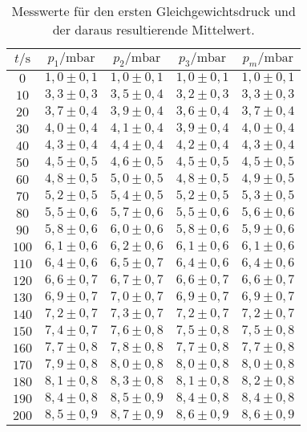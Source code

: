 \begin{table}[H]
  \centering
  \caption{Messwerte für den ersten Gleichgewichtsdruck und der daraus resultierende Mittelwert.}
  \label{tab:pm}
  \begin{tabular}{c c c c c}
    \toprule
  $t/\si{\second}$ & $p_1 /\si{\milli\bar}$ & $p_2 /\si{\milli\bar}$ & $p_3 /\si{\milli\bar}$ & $p_m /\si{\milli\bar}$ \\
    \midrule
    $  0$ & $ 1,0 \pm 0,1 $ & $ 1,0 \pm 0,1 $ & $ 1,0 \pm 0,1 $& $ 1,0 \pm 0,1 $ \\ 
    $ 10$ & $ 3,3 \pm 0,3 $ & $ 3,5 \pm 0,4 $ & $ 3,2 \pm 0,3 $& $ 3,3 \pm 0,3 $ \\ 
    $ 20$ & $ 3,7 \pm 0,4 $ & $ 3,9 \pm 0,4 $ & $ 3,6 \pm 0,4 $& $ 3,7 \pm 0,4 $ \\ 
    $ 30$ & $ 4,0 \pm 0,4 $ & $ 4,1 \pm 0,4 $ & $ 3,9 \pm 0,4 $& $ 4,0 \pm 0,4 $ \\ 
    $ 40$ & $ 4,3 \pm 0,4 $ & $ 4,4 \pm 0,4 $ & $ 4,2 \pm 0,4 $& $ 4,3 \pm 0,4 $ \\ 
    $ 50$ & $ 4,5 \pm 0,5 $ & $ 4,6 \pm 0,5 $ & $ 4,5 \pm 0,5 $& $ 4,5 \pm 0,5 $ \\ 
    $ 60$ & $ 4,8 \pm 0,5 $ & $ 5,0 \pm 0,5 $ & $ 4,8 \pm 0,5 $& $ 4,9 \pm 0,5 $ \\ 
    $ 70$ & $ 5,2 \pm 0,5 $ & $ 5,4 \pm 0,5 $ & $ 5,2 \pm 0,5 $& $ 5,3 \pm 0,5 $ \\ 
    $ 80$ & $ 5,5 \pm 0,6 $ & $ 5,7 \pm 0,6 $ & $ 5,5 \pm 0,6 $& $ 5,6 \pm 0,6 $ \\ 
    $ 90$ & $ 5,8 \pm 0,6 $ & $ 6,0 \pm 0,6 $ & $ 5,8 \pm 0,6 $& $ 5,9 \pm 0,6 $ \\ 
    $100$ & $ 6,1 \pm 0,6 $ & $ 6,2 \pm 0,6 $ & $ 6,1 \pm 0,6 $& $ 6,1 \pm 0,6 $ \\ 
    $110$ & $ 6,4 \pm 0,6 $ & $ 6,5 \pm 0,7 $ & $ 6,4 \pm 0,6 $& $ 6,4 \pm 0,6 $ \\ 
    $120$ & $ 6,6 \pm 0,7 $ & $ 6,7 \pm 0,7 $ & $ 6,6 \pm 0,7 $& $ 6,6 \pm 0,7 $ \\ 
    $130$ & $ 6,9 \pm 0,7 $ & $ 7,0 \pm 0,7 $ & $ 6,9 \pm 0,7 $& $ 6,9 \pm 0,7 $ \\ 
    $140$ & $ 7,2 \pm 0,7 $ & $ 7,3 \pm 0,7 $ & $ 7,2 \pm 0,7 $& $ 7,2 \pm 0,7 $ \\ 
    $150$ & $ 7,4 \pm 0,7 $ & $ 7,6 \pm 0,8 $ & $ 7,5 \pm 0,8 $& $ 7,5 \pm 0,8 $ \\ 
    $160$ & $ 7,7 \pm 0,8 $ & $ 7,8 \pm 0,8 $ & $ 7,7 \pm 0,8 $& $ 7,7 \pm 0,8 $ \\ 
    $170$ & $ 7,9 \pm 0,8 $ & $ 8,0 \pm 0,8 $ & $ 8,0 \pm 0,8 $& $ 8,0 \pm 0,8 $ \\ 
    $180$ & $ 8,1 \pm 0,8 $ & $ 8,3 \pm 0,8 $ & $ 8,1 \pm 0,8 $& $ 8,2 \pm 0,8 $ \\ 
    $190$ & $ 8,4 \pm 0,8 $ & $ 8,5 \pm 0,9 $ & $ 8,4 \pm 0,8 $& $ 8,4 \pm 0,8 $ \\ 
    $200$ & $ 8,5 \pm 0,9 $ & $ 8,7 \pm 0,9 $ & $ 8,6 \pm 0,9 $& $ 8,6 \pm 0,9 $ \\ 
    \bottomrule
  \end{tabular}
\end{table}

